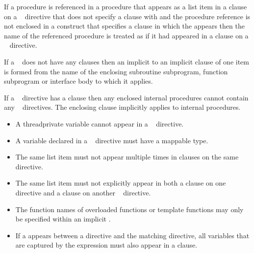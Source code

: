 \begin{fortranspecific}
If a procedure is referenced in a procedure that appears as a list item in a 
clause on a ~ directive that does not specify a 
clause with  and the procedure reference is not
enclosed in a  construct that specifies a  clause in which the
  appears then the name of the referenced procedure is
treated as if it had appeared in a  clause on a ~ directive.

If a ~ does not have any clauses then an implicit
 to an implicit  clause of one item is formed from
the name of the enclosing subroutine subprogram, function subprogram or
interface body to which it applies.

If a ~ directive has a
 clause then any enclosed internal procedures cannot contain 
any ~ directives. The enclosing  
clause implicitly applies to internal procedures. 
\end{fortranspecific}


\restrictions
\begin{itemize}
\item A threadprivate variable cannot appear in a
      ~ directive.
\item A variable declared in a ~ directive
      must have a mappable type.
\item The same list item must not appear multiple times in clauses on 
      the same directive.
\item The same list item must not explicitly appear in both a  clause on one
      ~ directive and a  clause on
      another ~ directive.
\end{itemize}

\begin{cppspecific}
\begin{itemize}
\item The function names of overloaded functions or template functions
      may only be specified within an implicit .
\item If a  appears between a
       directive and the matching 
      directive, all variables that are captured by the  expression
      must also appear in a  clause.
\end{itemize}
\end{cppspecific}

